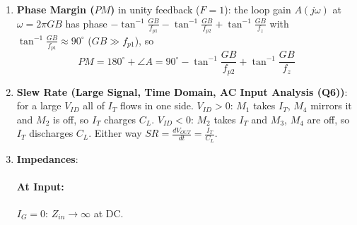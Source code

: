\begin{enumerate}
\begin{align*}
    \end{align*}
  \item \textbf{Phase Margin (\(PM\))} in unity feedback (\(F = 1\)): the loop gain \(A(j\omega)\) at
    \(\omega = 2\pi GB\) has phase
    \(-\tan^{-1}\frac{GB}{f_{p1}} - \tan^{-1}\frac{GB}{f_{p2}} + \tan^{-1}\frac{GB}{f_z}\)
    with \(\tan^{-1}\frac{GB}{f_{p1}} \approx 90^\circ\) (\(GB \gg f_{p1}\)), so
    \[
      PM = 180^\circ + \angle A = 90^\circ - \tan^{-1}\frac{GB}{f_{p2}} + \tan^{-1}\frac{GB}{f_z}
    \]
  \item \textbf{Slew Rate (Large Signal, Time Domain, AC Input Analysis (Q6))}: for a large \(V_{ID}\) all of \(I_T\) flows in one
    side. \(V_{ID} > 0\): \(M_1\) takes \(I_T\), \(M_4\) mirrors it and \(M_2\) is
    off, so \(I_T\) charges \(C_L\). \(V_{ID} < 0\): \(M_2\) takes \(I_T\) and
    \(M_3\), \(M_4\) are off, so \(I_T\) discharges \(C_L\). Either way
    \(SR = \frac{dV_{OUT}}{dt} = \frac{I_T}{C_L}\).
  \item \textbf{Impedances}:
    \paragraph{At Input:} \(I_G = 0\): \(Z_{in} \to \infty\) at DC.

\end{enumerate}
